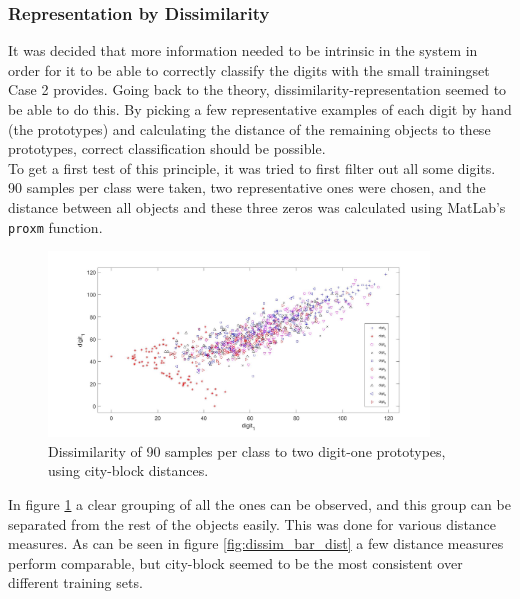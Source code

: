 \subsubsection*{Representation by Dissimilarity}
It was decided that more information needed to be intrinsic in the system in order for it to be able to correctly classify the digits with the small trainingset Case 2 provides. Going back to the theory, dissimilarity-representation seemed to be able to do this. By picking a few representative examples of each digit by hand (the prototypes) and calculating the distance of the remaining objects to these prototypes, correct classification should be possible. \\
\noindent To get a first test of this principle, it was tried to first filter out all some digits. 90 samples per class were taken, two representative ones were chosen, and the distance between all objects and these three zeros was calculated using MatLab's \texttt{proxm} function. 
\begin{figure}[H]
	\centering
	\includegraphics[width = 0.9\textwidth]{images/dissim_two_ones.jpg}
	\caption{Dissimilarity of 90 samples per class to two digit-one prototypes, using city-block distances.}
	\label{fig:dissim_two_ones}
\end{figure}
In figure \ref{fig:dissim_two_ones} a clear grouping of all the ones can be observed, and this group can be separated from the rest of the objects easily. This was done for various distance measures. As can be seen in figure \ref{fig:dissim_bar_dist} a few distance measures perform comparable, but city-block seemed to be the most consistent over different training sets.  \\
